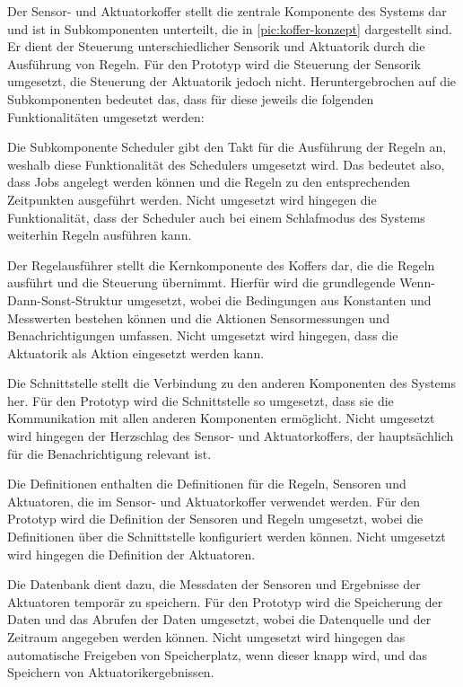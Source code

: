 Der Sensor- und Aktuatorkoffer stellt die zentrale Komponente des Systems dar und ist in Subkomponenten unterteilt, die in \cref{pic:koffer-konzept} dargestellt sind.
Er dient der Steuerung unterschiedlicher Sensorik und Aktuatorik durch die Ausführung von Regeln.
Für den Prototyp wird die Steuerung der Sensorik umgesetzt, die Steuerung der Aktuatorik jedoch nicht.
Heruntergebrochen auf die Subkomponenten bedeutet das, dass für diese jeweils die folgenden Funktionalitäten umgesetzt werden:

Die Subkomponente Scheduler gibt den Takt für die Ausführung der Regeln an, weshalb diese Funktionalität des Schedulers umgesetzt wird.
Das bedeutet also, dass Jobs angelegt werden können und die Regeln zu den entsprechenden Zeitpunkten ausgeführt werden.
Nicht umgesetzt wird hingegen die Funktionalität, dass der Scheduler auch bei einem Schlafmodus des Systems weiterhin Regeln ausführen kann.

Der Regelausführer stellt die Kernkomponente des Koffers dar, die die Regeln ausführt und die Steuerung übernimmt.
Hierfür wird die grundlegende Wenn-Dann-Sonst-Struktur umgesetzt, wobei die Bedingungen aus Konstanten und Messwerten bestehen können und die Aktionen Sensormessungen und Benachrichtigungen umfassen.
Nicht umgesetzt wird hingegen, dass die Aktuatorik als Aktion eingesetzt werden kann.

Die Schnittstelle stellt die Verbindung zu den anderen Komponenten des Systems her.
Für den Prototyp wird die Schnittstelle so umgesetzt, dass sie die Kommunikation mit allen anderen Komponenten ermöglicht.
Nicht umgesetzt wird hingegen der Herzschlag des Sensor- und Aktuatorkoffers, der hauptsächlich für die Benachrichtigung relevant ist.

Die Definitionen enthalten die Definitionen für die Regeln, Sensoren und Aktuatoren, die im Sensor- und Aktuatorkoffer verwendet werden.
Für den Prototyp wird die Definition der Sensoren und Regeln umgesetzt, wobei die Definitionen über die Schnittstelle konfiguriert werden können.
Nicht umgesetzt wird hingegen die Definition der Aktuatoren.

Die Datenbank dient dazu, die Messdaten der Sensoren und Ergebnisse der Aktuatoren temporär zu speichern.
Für den Prototyp wird die Speicherung der Daten und das Abrufen der Daten umgesetzt, wobei die Datenquelle und der Zeitraum angegeben werden können.
Nicht umgesetzt wird hingegen das automatische Freigeben von Speicherplatz, wenn dieser knapp wird, und das Speichern von Aktuatorikergebnissen.

